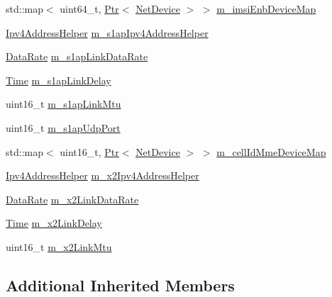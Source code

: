 \begin{DoxyCompactItemize}
\item 
std\+::map$<$ uint64\+\_\+t, \hyperlink{classns3_1_1Ptr}{Ptr}$<$ \hyperlink{classns3_1_1NetDevice}{Net\+Device} $>$ $>$ \hyperlink{classns3_1_1MmWavePointToPointEpcHelper_a36c8083a300827d6abf1ae6658f380c6}{m\+\_\+imsi\+Enb\+Device\+Map}
\item 
\hyperlink{classns3_1_1Ipv4AddressHelper}{Ipv4\+Address\+Helper} \hyperlink{classns3_1_1MmWavePointToPointEpcHelper_ab92256e97561ddae3bf75005d3197d7a}{m\+\_\+s1ap\+Ipv4\+Address\+Helper}
\item 
\hyperlink{classns3_1_1DataRate}{Data\+Rate} \hyperlink{classns3_1_1MmWavePointToPointEpcHelper_a44dd93ffe2c0e326f3fd61e132c59f24}{m\+\_\+s1ap\+Link\+Data\+Rate}
\item 
\hyperlink{classns3_1_1Time}{Time} \hyperlink{classns3_1_1MmWavePointToPointEpcHelper_a1fe106e13b5ec03c2e14d91abff84f7e}{m\+\_\+s1ap\+Link\+Delay}
\item 
uint16\+\_\+t \hyperlink{classns3_1_1MmWavePointToPointEpcHelper_a5c9ee81e5708d30dc59e1f66bcfe226b}{m\+\_\+s1ap\+Link\+Mtu}
\item 
uint16\+\_\+t \hyperlink{classns3_1_1MmWavePointToPointEpcHelper_ad1f7549ba3936b11b31d87caba866d76}{m\+\_\+s1ap\+Udp\+Port}
\item 
std\+::map$<$ uint16\+\_\+t, \hyperlink{classns3_1_1Ptr}{Ptr}$<$ \hyperlink{classns3_1_1NetDevice}{Net\+Device} $>$ $>$ \hyperlink{classns3_1_1MmWavePointToPointEpcHelper_a0c48b7221642d1cf7f76a66bd4b3164c}{m\+\_\+cell\+Id\+Mme\+Device\+Map}
\item 
\hyperlink{classns3_1_1Ipv4AddressHelper}{Ipv4\+Address\+Helper} \hyperlink{classns3_1_1MmWavePointToPointEpcHelper_ab60ecaf7adee417a4db06a055b0b1e5f}{m\+\_\+x2\+Ipv4\+Address\+Helper}
\item 
\hyperlink{classns3_1_1DataRate}{Data\+Rate} \hyperlink{classns3_1_1MmWavePointToPointEpcHelper_a00fbca1c04f854302d9ff643b24b7c57}{m\+\_\+x2\+Link\+Data\+Rate}
\item 
\hyperlink{classns3_1_1Time}{Time} \hyperlink{classns3_1_1MmWavePointToPointEpcHelper_ae014d27a362f6edb9c82405d2fd35e98}{m\+\_\+x2\+Link\+Delay}
\item 
uint16\+\_\+t \hyperlink{classns3_1_1MmWavePointToPointEpcHelper_a51de907fdf82a42d7ce14aac988255b3}{m\+\_\+x2\+Link\+Mtu}
\end{DoxyCompactItemize}
\subsection*{Additional Inherited Members}


